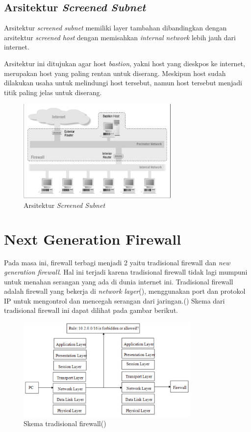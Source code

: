 \subsection{Arsitektur \textit{Screened Subnet}}

Arsitektur \textit{screened subnet} memiliki layer tambahan dibandingkan dengan arsitektur \textit{screened host} dengan memisahkan \textit{internal network} lebih jauh dari internet.

Arsitektur ini ditujukan agar host \textit{bastion}, yakni host yang dieskpos ke internet, merupakan host yang paling rentan untuk diserang. Meskipun host sudah dilakukan usaha untuk melindungi host tersebut, namun host tersebut menjadi titik paling jelas untuk diserang.

\begin{figure}[H]
	\centering
	\includegraphics[width=300px]{resources/screened_subnet.png}
	\caption{Arsitektur \textit{Screened Subnet}}
	\label{fig:screened_subnet}
\end{figure}

\section{Next Generation Firewall}
Pada masa ini, firewall terbagi menjadi 2 yaitu tradisional firewall dan \textit{new generation firewall}. Hal ini terjadi karena tradisional firewall tidak lagi mumpuni untuk menahan serangan yang ada di dunia internet ini. 
Tradisional firewall adalah firewall yang bekerja di \textit{network layer}(\cite{nicoll2004challenges}), menggunakan port dan protokol IP untuk mengontrol dan mencegah serangan dari jaringan.(\cite{zhong2012design}) Skema dari tradisional firewall ini dapat dilihat pada gambar berikut.
\begin{figure}[H]
	\centering
	\includegraphics[width=0.8\textwidth]{resources/tradisional_firewall.png}
	\caption{Skema tradisional firewall(\cite{zhong2012design})}
	\label{fig:tradisional_firewall}
\end{figure}


